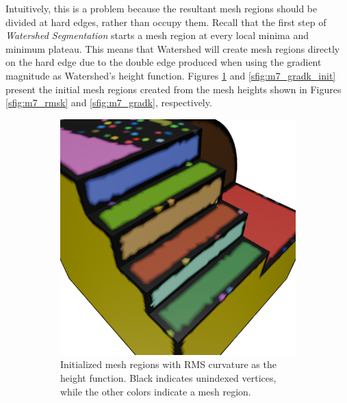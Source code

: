 Intuitively, this is a problem because the resultant mesh regions should be divided at hard edges, rather than occupy them.
Recall that the first step of \textit{Watershed Segmentation} starts a mesh region at every local minima and minimum plateau.
This means that Watershed will create mesh regions directly on the hard edge due to the double edge produced when using the gradient magnitude as Watershed's height function.
Figures \ref{sfig:m7_rmsk_init} and \ref{sfig:m7_gradk_init} present the initial mesh regions created from the mesh heights shown in Figures \ref{sfig:m7_rmsk} and \ref{sfig:m7_gradk}, respectively.

\begin{figure}[htb]
	\begin{subfigure}[t]{0.42\textwidth}
		\centering
		\includegraphics[width=\linewidth]{../resources/curvature/m7120369_rmsk_init.png}
		\caption{%
Initialized mesh regions with RMS curvature as the height function.
Black indicates unindexed vertices, while the other colors indicate a mesh region.
}
		\label{sfig:m7_rmsk_init}
	\end{subfigure}
	\hfill
	\begin{subfigure}[t]{0.42\textwidth}
		\centering

\end{subfigure}
\end{figure}
